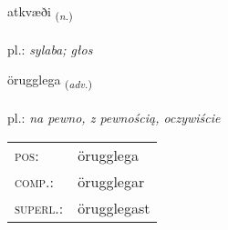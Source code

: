 \documentclass[frontgrid, backgrid]{flacards}\usepackage[]{graphicx}\usepackage[]{xcolor}
\begin{document}
\renewcommand{\flhead}{\vskip5pt \fboxsep=0pt {\small\bfseries\footnotesize Nafnorð | Noun}}
\renewcommand{\fcfoot}{\vskip5pt \fboxsep=0pt \hspace{2pt}{\small\bfseries\footnotesize 2K}}

\renewcommand{\blhead}{\vskip5pt {\small\bfseries\footnotesize Nafnorð | Noun }}
\renewcommand{\bcfoot}{\vskip5pt \hspace{2pt}{\small\bfseries\footnotesize 2K}}


{atkvæði \small{\textsubscript{(\textit{n.})}} \\[1ex] %
\textphonetic{[aːtkʰvaiðɪ]} \\
pl.: \emph{sylaba; głos} \\  [2ex]
\renewcommand*{\arraystretch}{0.8}
}

\renewcommand{\flhead}{\vskip5pt \fboxsep=0pt {\small\bfseries\footnotesize Atviksorð | Adverb}}
\renewcommand{\fcfoot}{\vskip5pt \fboxsep=0pt \hspace{2pt}{\small\bfseries\footnotesize 2K}}

\renewcommand{\blhead}{\vskip5pt {\small\bfseries\footnotesize Atviksorð | Adverb }}
\renewcommand{\bcfoot}{\vskip5pt \hspace{2pt}{\small\bfseries\footnotesize 2K}}


{örugglega \small{\textsubscript{(\textit{adv.})}} \\[1ex] %
\textphonetic{[œːrʏklɛɣa]} \\
pl.: \emph{na pewno, z pewnością, oczywiście} \\  [2ex]
\renewcommand*{\arraystretch}{0.8}
\begin{tabular}{ll}
\textsc{pos}: & örugglega \\ 
\textsc{comp.}: & örugglegar \\ 
\textsc{superl.}: & örugglegast \\
\end{tabular}
}
\end{document}
